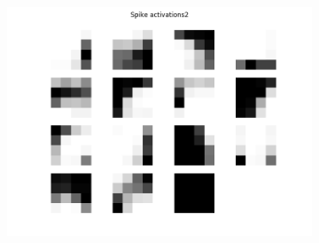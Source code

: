 \begin{figure}
\begin{subfigure}[t]{.24\textwidth}
  		\label{fig:sub2}
	\end{subfigure}
	\begin{subfigure}[t]{.24\textwidth}
  		\centering
  		\includegraphics[width=.9\linewidth]{imgs/convert/cuba00002.png}
  		\label{fig:sub2}
	\end{subfigure}	


\end{figure}
